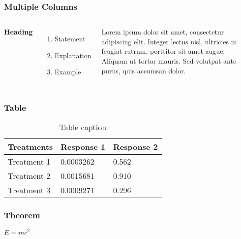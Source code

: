 \documentclass{beamer}
\begin{document}
\begin{frame}
\frametitle{Multiple Columns}
\begin{columns}[c] %

\textbf{Heading}
\begin{enumerate}
\item Statement
\item Explanation
\item Example
\end{enumerate}

Lorem ipsum dolor sit amet, consectetur adipiscing elit. Integer lectus nisl, ultricies in feugiat rutrum, porttitor sit amet augue. Aliquam ut tortor mauris. Sed volutpat ante purus, quis accumsan dolor.

\end{columns}
\end{frame}


\begin{frame}
\frametitle{Table}
\begin{table}
\begin{tabular}{l l l}
\toprule
\textbf{Treatments} & \textbf{Response 1} & \textbf{Response 2}\\
\midrule
Treatment 1 & 0.0003262 & 0.562 \\
Treatment 2 & 0.0015681 & 0.910 \\
Treatment 3 & 0.0009271 & 0.296 \\
\bottomrule
\end{tabular}
\caption{Table caption}
\end{table}
\end{frame}


\begin{frame}
\frametitle{Theorem}
\begin{theorem}
$E = mc^2$
\end{theorem}
\end{frame}
\end{document}
